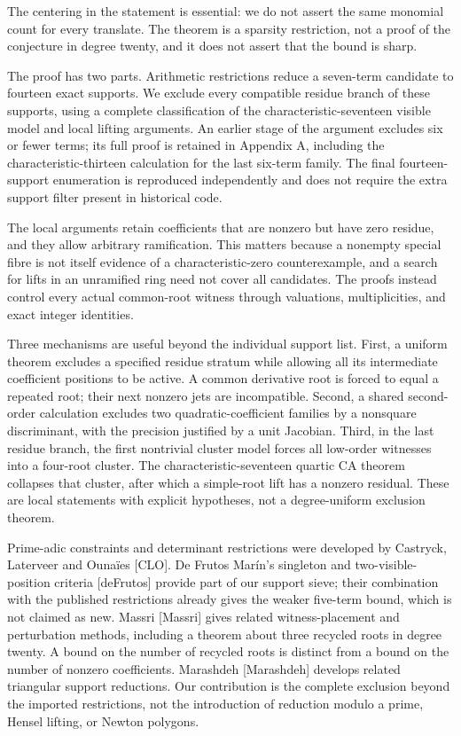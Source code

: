 \documentclass[
  british,
  10pt,
  a4paper,
]{article}
\newcounter{none} %
\begin{document}
The centering in the statement is essential: we do not assert the same
monomial count for every translate. The theorem is a sparsity
restriction, not a proof of the conjecture in degree twenty, and it does
not assert that the bound is sharp.

The proof has two parts. Arithmetic restrictions reduce a seven-term
candidate to fourteen exact supports. We exclude every compatible
residue branch of these supports, using a complete classification of the
characteristic-seventeen visible model and local lifting arguments. An
earlier stage of the argument excludes six or fewer terms; its full
proof is retained in Appendix A, including the characteristic-thirteen
calculation for the last six-term family. The final fourteen-support
enumeration is reproduced independently and does not require the extra
support filter present in historical code.

The local arguments retain coefficients that are nonzero but have zero
residue, and they allow arbitrary ramification. This matters because a
nonempty special fibre is not itself evidence of a characteristic-zero
counterexample, and a search for lifts in an unramified ring need not
cover all candidates. The proofs instead control every actual
common-root witness through valuations, multiplicities, and exact
integer identities.

Three mechanisms are useful beyond the individual support list. First, a
uniform theorem excludes a specified residue stratum while allowing all
its intermediate coefficient positions to be active. A common derivative
root is forced to equal a repeated root; their next nonzero jets are
incompatible. Second, a shared second-order calculation excludes two
quadratic-coefficient families by a nonsquare discriminant, with the
precision justified by a unit Jacobian. Third, in the last residue
branch, the first nontrivial cluster model forces all low-order
witnesses into a four-root cluster. The characteristic-seventeen quartic
CA theorem collapses that cluster, after which a simple-root lift has a
nonzero residual. These are local statements with explicit hypotheses,
not a degree-uniform exclusion theorem.

Prime-adic constraints and determinant restrictions were developed by
Castryck, Laterveer and Ounaïes {[}CLO{]}. De Frutos Marín's singleton
and two-visible-position criteria {[}deFrutos{]} provide part of our
support sieve; their combination with the published restrictions already
gives the weaker five-term bound, which is not claimed as new. Massri
{[}Massri{]} gives related witness-placement and perturbation methods,
including a theorem about three recycled roots in degree twenty. A bound
on the number of recycled roots is distinct from a bound on the number
of nonzero coefficients. Marashdeh {[}Marashdeh{]} develops related
triangular support reductions. Our contribution is the complete
exclusion beyond the imported restrictions, not the introduction of
reduction modulo a prime, Hensel lifting, or Newton polygons.
\end{document}
